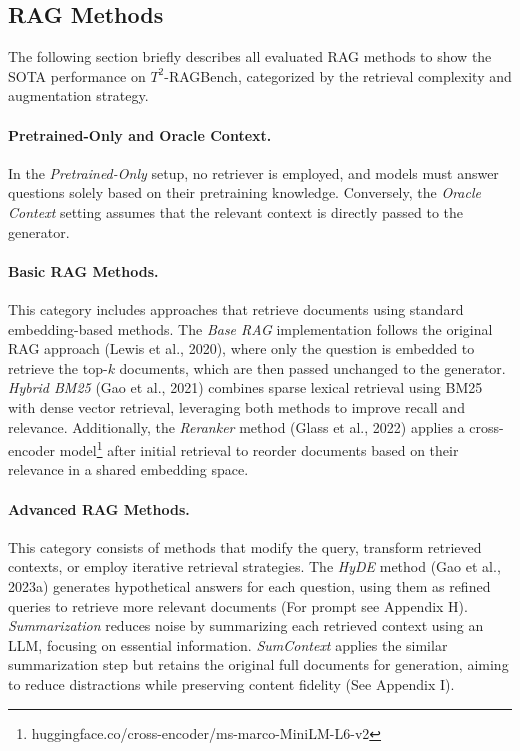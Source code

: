 \documentclass[10pt]{article}
\begin{document}
\subsection{RAG Methods}
The following section briefly describes all evaluated RAG methods to show the SOTA performance on $T^{2}$-RAGBench, categorized by the retrieval complexity and augmentation strategy.

\paragraph{Pretrained-Only and Oracle Context.} In the \textit{Pretrained-Only} setup, no retriever is employed, and models must answer questions solely based on their pretraining knowledge. Conversely, the \textit{Oracle Context} setting assumes that the relevant context is directly passed to the generator.

\paragraph{Basic RAG Methods.} This category includes approaches that retrieve documents using standard embedding-based methods. The \textit{Base RAG} implementation follows the original RAG approach (Lewis et al., 2020), where only the question is embedded to retrieve the top-$k$ documents, which are then passed unchanged to the generator. \textit{Hybrid BM25} (Gao et al., 2021) combines sparse lexical retrieval using BM25 with dense vector retrieval, leveraging both methods to improve recall and relevance. Additionally, the \textit{Reranker} method (Glass et al., 2022) applies a cross-encoder model\footnote{huggingface.co/cross-encoder/ms-marco-MiniLM-L6-v2} after initial retrieval to reorder documents based on their relevance in a shared embedding space.

\paragraph{Advanced RAG Methods.} This category consists of methods that modify the query, transform retrieved contexts, or employ iterative retrieval strategies. The \textit{HyDE} method (Gao et al., 2023a) generates hypothetical answers for each question, using them as refined queries to retrieve more relevant documents (For prompt see Appendix H). \textit{Summarization} reduces noise by summarizing each retrieved context using an LLM, focusing on essential information. \textit{SumContext} applies the similar summarization step but retains the original full documents for generation, aiming to reduce distractions while preserving content fidelity (See Appendix I).
\end{document}
